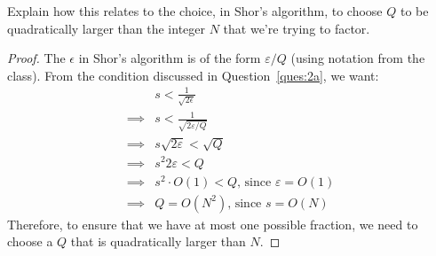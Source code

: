 \begin{solution}[label=ques:2b]
  \begin{question}
    Explain how this relates to the choice, in Shor's algorithm, to choose $Q$ to be quadratically larger than the integer $N$ that we're trying to factor.
  \end{question}
  \tcblower{}
  \begin{proof}
    The $\epsilon$ in Shor's algorithm is of the form $\varepsilon/Q$ (using notation from the class). From the condition discussed in Question~\ref{ques:2a}, we want:
    \begin{equation}
      \begin{split}
        &s < \frac{1}{\sqrt{2\epsilon}}\\
        \implies &s < \frac{1}{\sqrt{2 \varepsilon / Q}}\\
        \implies &s\sqrt{2\varepsilon} < \sqrt{Q}\\
        \implies &s^2 2 \varepsilon < Q\\
        \implies &s^2 \cdot O(1) < Q\text{, since }\varepsilon = O(1)\\
        \implies &Q = O(N^2)\text{, since }s = O(N)
      \end{split}
      \label{eq:bigQ}
    \end{equation}
    Therefore, to ensure that we have at most one possible fraction, we need to choose a $Q$ that is quadratically larger than $N$.
  \end{proof}
\end{solution}

